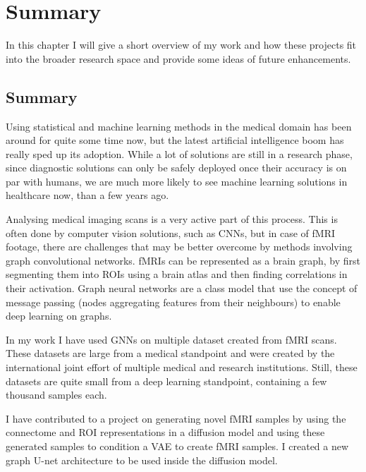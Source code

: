 \chapter{Summary}

In this chapter I will give a short overview of my work and how these projects fit into the broader research space and provide some ideas of future enhancements.

\section{Summary}

Using statistical and machine learning methods in the medical domain has been around for quite some time now, but the latest artificial intelligence boom has really sped up its adoption. While a lot of solutions are still in a research phase, since diagnostic solutions can only be safely deployed once their accuracy is on par with humans, we are much more likely to see machine learning solutions in healthcare now, than a few years ago.

Analysing medical imaging scans is a  very active part of this process. This is often done by computer vision solutions, such as CNNs, but in case of fMRI footage, there are challenges that may be better overcome by methods involving graph convolutional networks. fMRIs can be represented as a brain graph, by first segmenting them into ROIs using a brain atlas and then finding correlations in their activation. Graph neural networks are a class model that use the concept of message passing (nodes aggregating features from their neighbours) to enable deep learning on graphs. 


In my work I have used GNNs on multiple dataset created from fMRI scans. These datasets are large from a medical standpoint and were created by the international joint effort of multiple medical and research institutions. Still, these datasets are quite small from a deep learning standpoint, containing a few thousand samples each.

I have contributed to a project on generating novel fMRI samples by using the connectome and ROI representations in a diffusion model and using these generated samples to condition a VAE to create fMRI samples. I created a new graph U-net architecture to be used inside the diffusion model. 

